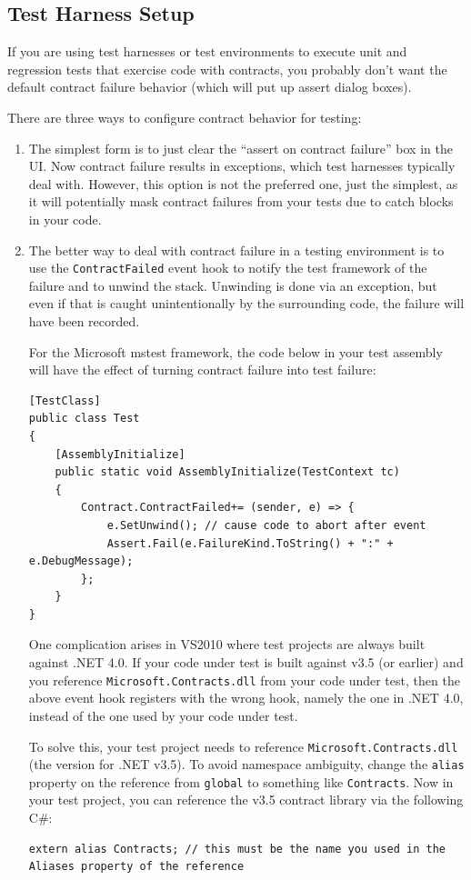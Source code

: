 \documentclass{article}
\newcommand{\code}[1]{\lstinline{#1}}
\begin{document}
\subsection{Test Harness Setup}
\label{sec:testharness}

If you are using test harnesses or test environments to execute unit
and regression tests that exercise code with contracts, you probably
don't want the default contract failure behavior (which will put up
assert dialog boxes).

There are three ways to configure contract behavior for testing:
\begin{enumerate}
\item The simplest form is to just clear the ``assert on contract
  failure'' box in the UI. Now contract failure results in exceptions,
  which test harnesses typically deal with. However, this option is
  not the preferred one, just the simplest, as it will potentially
  mask contract failures from your tests due to catch blocks in your
  code.

\item The better way to deal with contract failure in a testing
  environment is to use the \code{ContractFailed} event hook to notify
  the test framework of the failure and to unwind the stack. Unwinding
  is done via an exception, but even if that is caught unintentionally
  by the surrounding code, the failure will have been recorded.

For the Microsoft \textsf{mstest} framework, the code below in your
test assembly will have the effect of turning contract failure into
test failure:
\begin{lstlisting}
[TestClass]
public class Test
{
    [AssemblyInitialize]
    public static void AssemblyInitialize(TestContext tc)
    {
        Contract.ContractFailed+= (sender, e) => {
            e.SetUnwind(); // cause code to abort after event
            Assert.Fail(e.FailureKind.ToString() + ":" + e.DebugMessage);
        };
    }
}
\end{lstlisting}
\noindent One complication arises in VS2010 where test projects are
always built against .NET 4.0. If your code under test is built
against v3.5 (or earlier) and you reference \code{Microsoft.Contracts.dll} from
your code under test, then the above event hook registers with the
wrong hook, namely the one in .NET 4.0, instead of the one used by your
code under test.

To solve this, your test project needs to reference
\code{Microsoft.Contracts.dll} (the version for .NET v3.5). To avoid
namespace ambiguity, change the \code{alias} property on the reference
from \code{global} to something like \code{Contracts}. Now in your
test project, you can reference the v3.5 contract library via the
following C\#:
\begin{lstlisting}
extern alias Contracts; // this must be the name you used in the Aliases property of the reference 


\end{lstlisting}
\end{enumerate}
\end{document}
